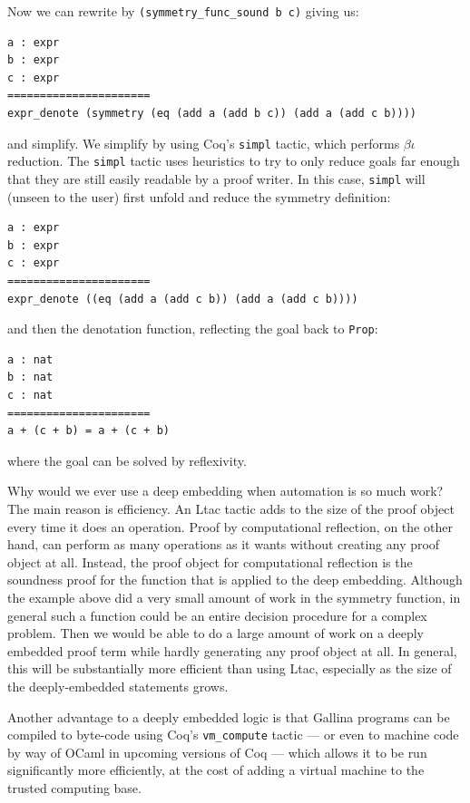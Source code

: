 \documentclass{puthesis}
\begin{document}
Now we can rewrite by \lstinline|(symmetry_func_sound b c)| giving us:
\pagebreak
\begin{lstlisting}
a : expr
b : expr
c : expr
======================
expr_denote (symmetry (eq (add a (add b c)) (add a (add c b))))  
\end{lstlisting}

and simplify. We simplify by using Coq's \lstinline|simpl| tactic,
which performs $\beta\iota$ reduction. The \lstinline|simpl| tactic uses
heuristics to try to only reduce goals far enough that they are still
easily readable by a proof writer. In this case, \lstinline|simpl| 
will (unseen to the user) first unfold and reduce the symmetry
definition:

\begin{lstlisting}
a : expr
b : expr
c : expr
======================
expr_denote ((eq (add a (add c b)) (add a (add c b))))  
\end{lstlisting}

\noindent and then the denotation function, reflecting the goal back
to \lstinline|Prop|:

\begin{lstlisting}
a : nat
b : nat
c : nat
======================
a + (c + b) = a + (c + b) 
\end{lstlisting}

\noindent where the goal can be solved by reflexivity.

Why would we ever use a deep embedding when automation is so much
work? The main reason is efficiency. An Ltac tactic adds to the size
of the proof object every time it does an operation. Proof by
computational reflection, on the other hand, can perform as many
operations as it wants without creating any proof object at
all. Instead, the proof object for computational reflection is the
soundness proof for the function that is applied to the deep
embedding. Although the example above did a very small amount of work
in the symmetry function, in general such a function could be an
entire decision procedure for a complex problem. Then we would be able
to do a large amount of work on a deeply embedded proof term while
hardly generating any proof object at all. In general, this will be
substantially more efficient than using Ltac, especially as the size
of the deeply-embedded statements grows.

Another advantage to a deeply embedded logic is that Gallina programs
can be compiled to byte-code using Coq's \lstinline|vm_compute|
tactic --- or even to machine code by way of OCaml in upcoming versions
of Coq --- which allows it to be run significantly more efficiently, at
the cost of adding a virtual machine to the trusted computing base.
\end{document}
